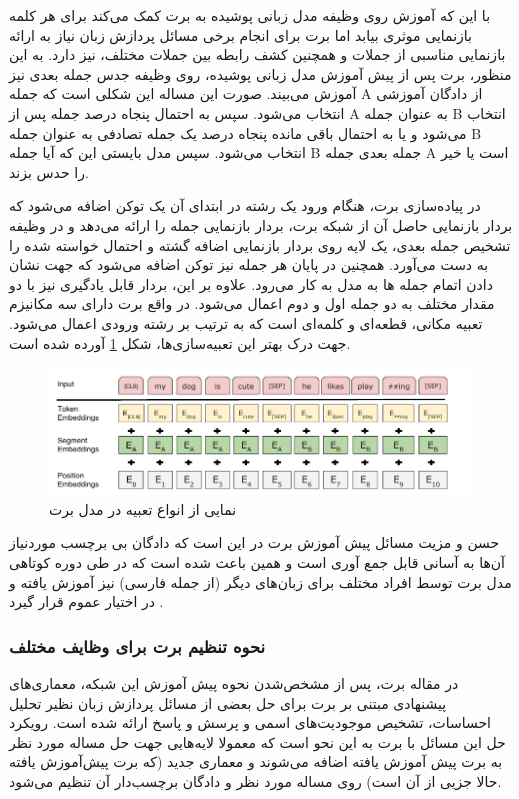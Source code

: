 با این که آموزش روی وظیفه مدل زبانی پوشیده به برت کمک می‌کند برای هر کلمه بازنمایی موثری بیابد اما برت برای انجام برخی مسائل پردازش زبان نیاز به ارائه بازنمایی مناسبی از جملات
و همچنین کشف رابطه بین جملات مختلف،
 نیز دارد. به این منظور، برت پس از پیش آموزش مدل زبانی پوشیده، روی وظیفه جدس جمله بعدی نیز آموزش می‌بیند. صورت این مساله این شکلی است که جمله A از دادگان آموزشی انتخاب می‌شود. سپس به احتمال پنجاه درصد جمله پس از A به عنوان جمله B انتخاب می‌شود و یا به احتمال باقی مانده پنجاه درصد یک جمله تصادفی به عنوان جمله B انتخاب می‌شود. سپس مدل بایستی این که آیا جمله B جمله بعدی جمله A است یا خیر را حدس بزند. 

 در پیاده‌سازی برت، هنگام ورود یک رشته در ابتدای آن یک توکن
\lr{[CLS]}
اضافه می‌شود که بردار بازنمایی حاصل آن از شبکه برت، بردار بازنمایی جمله را ارائه می‌دهد و در وظیفه تشخیص جمله بعدی، یک لایه
روی بردار بازنمایی
\lr{[CLS]}
اضافه گشته و احتمال خواسته شده را به دست می‌آورد. همچنین در پایان هر جمله نیز توکن
\lr{[SEP]}
اضافه می‌شود که جهت نشان دادن اتمام جمله ها به مدل به کار می‌رود. علاوه بر این، بردار
قابل یادگیری نیز با دو مقدار مختلف به دو جمله اول و دوم اعمال می‌شود. در واقع برت دارای سه مکانیزم تعبیه مکانی، قطعه‌ای و کلمه‌ای است که به ترتیب بر رشته ورودی اعمال می‌شود. جهت درک بهتر این تعبیه‌سازی‌ها، شکل
\ref{fig:chap3:bert_embeddings}
 آورده شده است.

 \begin{figure}[h]
 	\centering
 	\includegraphics[width=1\textwidth]{images/chap3/bert_embeddings.png}
 	\caption[نمایی از انواع تعبیه در مدل برت]
 	{
 		نمایی از انواع تعبیه در مدل برت
 		\cite{bert}
 	}
 	\label{fig:chap3:bert_embeddings}
 \end{figure}

حسن و مزیت مسائل پیش آموزش برت در این است که دادگان بی برچسب موردنیاز آن‌ها به آسانی قابل جمع آوری است و همین باعث شده است که در طی دوره کوتاهی مدل برت 
توسط افراد مختلف
برای زبان‌های دیگر (از جمله فارسی) نیز آموزش یافته و در اختیار عموم قرار گیرد
\cite{parsbert}.

\subsubsection{نحوه تنظیم برت برای وظایف مختلف}
در مقاله برت،‌ پس از مشخص‌شدن نحوه پیش آموزش این شبکه، معماری‌های پیشنهادی مبتنی بر برت برای حل بعضی از مسائل پردازش زبان نظیر تحلیل احساسات، تشخیص موجودیت‌های اسمی و پرسش و پاسخ ارائه شده است. رویکرد حل این مسائل با برت به این نحو است که معمولا لایه‌هایی جهت حل مساله مورد نظر به برت پیش آموزش یافته اضافه می‌شوند و معماری جدید (که برت پیش‌آموزش یافته حالا جزیی از آن است) روی مساله مورد نظر و دادگان برچسب‌دار آن تنظیم می‌شود. 

